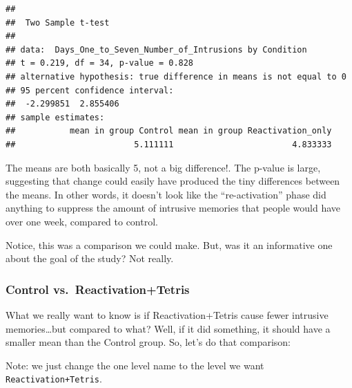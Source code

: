 \documentclass[]{book}
\newenvironment{Shaded}{\begin{snugshade}}{\end{snugshade}}
\newcommand{\KeywordTok}[1]{\textcolor[rgb]{0.13,0.29,0.53}{\textbf{{#1}}}}
\newcommand{\DataTypeTok}[1]{\textcolor[rgb]{0.13,0.29,0.53}{{#1}}}
\newcommand{\StringTok}[1]{\textcolor[rgb]{0.31,0.60,0.02}{{#1}}}
\newcommand{\OtherTok}[1]{\textcolor[rgb]{0.56,0.35,0.01}{{#1}}}
\newcommand{\NormalTok}[1]{{#1}}
\theoremstyle{definition}
\theoremstyle{definition}
\theoremstyle{definition}
\theoremstyle{remark}
\begin{document}
\begin{Shaded}
\end{Shaded}

\begin{verbatim}
## 
##  Two Sample t-test
## 
## data:  Days_One_to_Seven_Number_of_Intrusions by Condition
## t = 0.219, df = 34, p-value = 0.828
## alternative hypothesis: true difference in means is not equal to 0
## 95 percent confidence interval:
##  -2.299851  2.855406
## sample estimates:
##           mean in group Control mean in group Reactivation_only 
##                        5.111111                        4.833333
\end{verbatim}

The means are both basically 5, not a big difference!. The p-value is
large, suggesting that change could easily have produced the tiny
differences between the means. In other words, it doesn't look like the
``re-activation'' phase did anything to suppress the amount of intrusive
memories that people would have over one week, compared to control.

Notice, this was a comparison we could make. But, was it an informative
one about the goal of the study? Not really.

\subsubsection{Control
vs.~Reactivation+Tetris}\label{control-vs.reactivationtetris}

What we really want to know is if Reactivation+Tetris cause fewer
intrusive memories\ldots{}but compared to what? Well, if it did
something, it should have a smaller mean than the Control group. So,
let's do that comparison:

Note: we just change the one level name to the level we want
\texttt{Reactivation+Tetris}.
\end{document}
